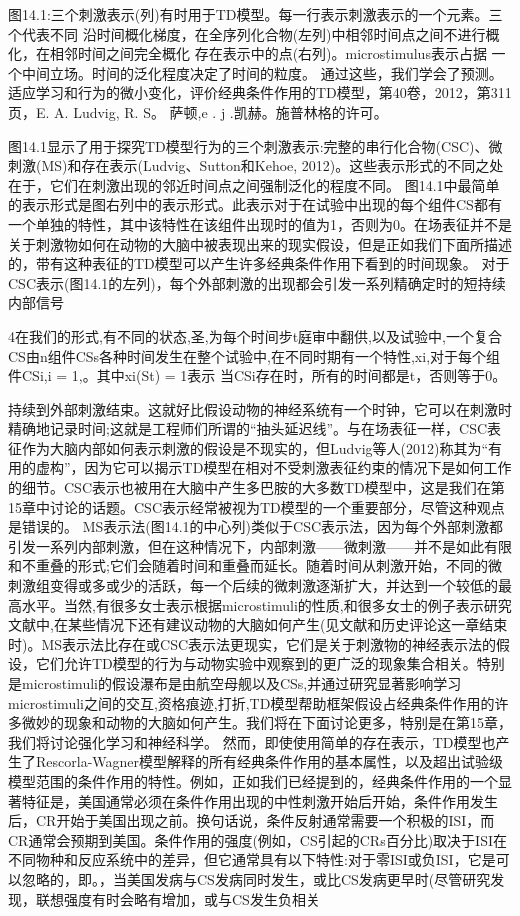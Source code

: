 图14.1:三个刺激表示(列)有时用于TD模型。每一行表示刺激表示的一个元素。三个代表不同
沿时间概化梯度，在全序列化合物(左列)中相邻时间点之间不进行概化，在相邻时间之间完全概化
存在表示中的点(右列)。microstimulus表示占据
一个中间立场。时间的泛化程度决定了时间的粒度。
通过这些，我们学会了预测。适应学习和行为的微小变化，评价经典条件作用的TD模型，第40卷，2012，第311页，E. A. Ludvig, R. S。
萨顿,e . j .凯赫。施普林格的许可。



图14.1显示了用于探究TD模型行为的三个刺激表示:完整的串行化合物(CSC)、微刺激(MS)和存在表示(Ludvig、Sutton和Kehoe, 2012)。这些表示形式的不同之处在于，它们在刺激出现的邻近时间点之间强制泛化的程度不同。
图14.1中最简单的表示形式是图右列中的表示形式。此表示对于在试验中出现的每个组件CS都有一个单独的特性，其中该特性在该组件出现时的值为1，否则为0。在场表征并不是关于刺激物如何在动物的大脑中被表现出来的现实假设，但是正如我们下面所描述的，带有这种表征的TD模型可以产生许多经典条件作用下看到的时间现象。
对于CSC表示(图14.1的左列)，每个外部刺激的出现都会引发一系列精确定时的短持续内部信号

4在我们的形式,有不同的状态,圣,为每个时间步t庭审中翻供,以及试验中,一个复合CS由n组件CSs各种时间发生在整个试验中,在不同时期有一个特性,xi,对于每个组件CSi,i = 1,。其中xi(St) = 1表示
当CSi存在时，所有的时间都是t，否则等于0。


持续到外部刺激结束。这就好比假设动物的神经系统有一个时钟，它可以在刺激时精确地记录时间;这就是工程师们所谓的“抽头延迟线”。与在场表征一样，CSC表征作为大脑内部如何表示刺激的假设是不现实的，但Ludvig等人(2012)称其为“有用的虚构”，因为它可以揭示TD模型在相对不受刺激表征约束的情况下是如何工作的细节。CSC表示也被用在大脑中产生多巴胺的大多数TD模型中，这是我们在第15章中讨论的话题。CSC表示经常被视为TD模型的一个重要部分，尽管这种观点是错误的。
MS表示法(图14.1的中心列)类似于CSC表示法，因为每个外部刺激都引发一系列内部刺激，但在这种情况下，内部刺激——微刺激——并不是如此有限和不重叠的形式;它们会随着时间和重叠而延长。随着时间从刺激开始，不同的微刺激组变得或多或少的活跃，每一个后续的微刺激逐渐扩大，并达到一个较低的最高水平。当然,有很多女士表示根据microstimuli的性质,和很多女士的例子表示研究文献中,在某些情况下还有建议动物的大脑如何产生(见文献和历史评论这一章结束时)。MS表示法比存在或CSC表示法更现实，它们是关于刺激物的神经表示法的假设，它们允许TD模型的行为与动物实验中观察到的更广泛的现象集合相关。特别是microstimuli的假设瀑布是由航空母舰以及CSs,并通过研究显著影响学习microstimuli之间的交互,资格痕迹,打折,TD模型帮助框架假设占经典条件作用的许多微妙的现象和动物的大脑如何产生。我们将在下面讨论更多，特别是在第15章，我们将讨论强化学习和神经科学。
然而，即使使用简单的存在表示，TD模型也产生了Rescorla-Wagner模型解释的所有经典条件作用的基本属性，以及超出试验级模型范围的条件作用的特性。例如，正如我们已经提到的，经典条件作用的一个显著特征是，美国通常必须在条件作用出现的中性刺激开始后开始，条件作用发生后，CR开始于美国出现之前。换句话说，条件反射通常需要一个积极的ISI，而CR通常会预期到美国。条件作用的强度(例如，CS引起的CRs百分比)取决于ISI在不同物种和反应系统中的差异，但它通常具有以下特性:对于零ISI或负ISI，它是可以忽略的，即。，当美国发病与CS发病同时发生，或比CS发病更早时(尽管研究发现，联想强度有时会略有增加，或与CS发生负相关

